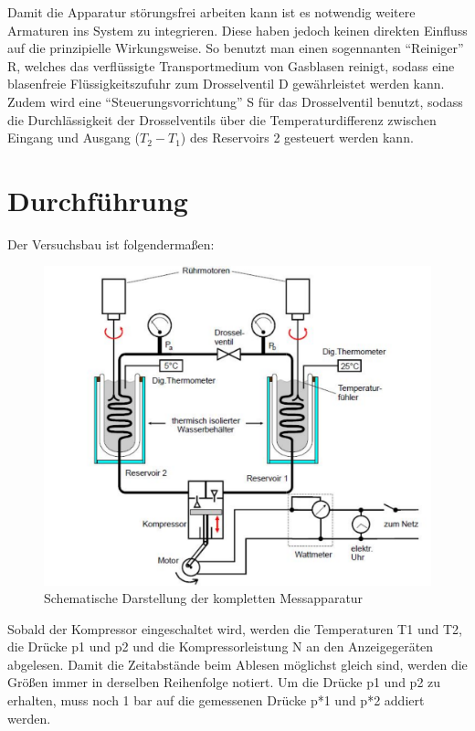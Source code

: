         Damit die Apparatur störungsfrei arbeiten kann ist es notwendig weitere Armaturen ins System zu integrieren. Diese haben jedoch keinen direkten Einfluss auf die prinzipielle Wirkungsweise. 
        So benutzt man einen sogennanten "`Reiniger"' R, welches das verflüssigte Transportmedium von Gasblasen reinigt, sodass eine blasenfreie Flüssigkeitszufuhr zum Drosselventil D gewährleistet werden kann.
        Zudem wird eine "`Steuerungsvorrichtung"' S für das Drosselventil benutzt, sodass die Durchlässigkeit der Drosselventils über die Temperaturdifferenz zwischen Eingang und Ausgang ($T_2 - T_1$) 
        des Reservoirs 2 gesteuert werden kann.

    \newpage
    \section{Durchführung}
    Der Versuchsbau ist folgendermaßen:
    \begin{figure}
               \centering
               \includegraphics[width=\textwidth]{aufbau_2.pdf}
               \caption{Schematische Darstellung der kompletten Messapparatur}
               \label{fig:scheW}
    \end{figure}

    Sobald der Kompressor eingeschaltet wird, werden die Temperaturen T1 und T2, die Drücke p1 und p2 und die Kompressorleistung N an den Anzeigegeräten abgelesen. Damit die Zeitabstände
    beim Ablesen möglichst gleich sind, werden die Größen immer in derselben Reihenfolge notiert. Um die Drücke p1 und p2 zu erhalten, muss noch 1 bar auf die gemessenen Drücke p*1 und p*2 addiert werden.

